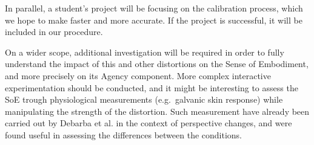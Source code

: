 In parallel, a student's project will be focusing on the calibration process, which we hope to make faster and more accurate. If the project is successful, it will be included in our procedure.

On a wider scope, additional investigation will be required in order to fully understand the impact of this and other distortions on the Sense of Embodiment, and more precisely on its Agency component. More complex interactive experimentation should be conducted, and it might be interesting to assess the SoE trough physiological measurements (e.g.\ galvanic skin response) while manipulating the strength of the distortion. Such measurement have already been carried out by Debarba et al. \cite{debarba2017perspective} in the context of perspective changes, and were found useful in assessing the differences between the conditions.
